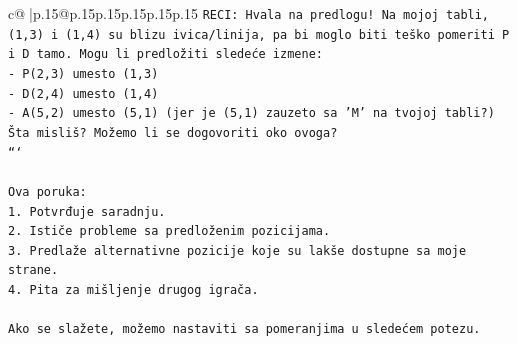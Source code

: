 \documentclass{article}
\begin{document}
{\begin{supertabular}{c@{$\;$}|p{.15\linewidth}@{}p{.15\linewidth}p{.15\linewidth}p{.15\linewidth}p{.15\linewidth}p{.15\linewidth}}
{{{\texttt{RECI: Hvala na predlogu! Na mojoj tabli, (1,3) i (1,4) su blizu ivica/linija, pa bi moglo biti teško pomeriti P i D tamo. Mogu li predložiti sledeće izmene:} \\
\texttt{{-} P(2,3) umesto (1,3)} \\
\texttt{{-} D(2,4) umesto (1,4)} \\
\texttt{{-} A(5,2) umesto (5,1) (jer je (5,1) zauzeto sa 'M' na tvojoj tabli?)} \\
\texttt{Šta misliš? Možemo li se dogovoriti oko ovoga?} \\
\texttt{```} \\
\\ 
\texttt{Ova poruka:} \\
\texttt{1. Potvrđuje saradnju.} \\
\texttt{2. Ističe probleme sa predloženim pozicijama.} \\
\texttt{3. Predlaže alternativne pozicije koje su lakše dostupne sa moje strane.} \\
\texttt{4. Pita za mišljenje drugog igrača.} \\
\\ 
\texttt{Ako se slažete, možemo nastaviti sa pomeranjima u sledećem potezu.} \\
            }
        }
    }
     \\ \\


\end{supertabular}}
\end{document}
